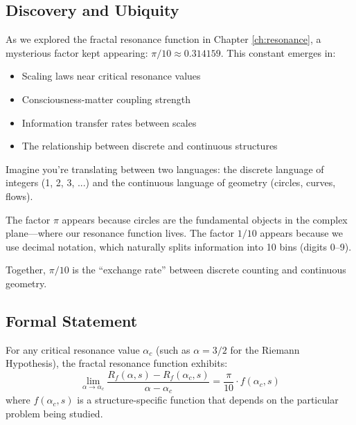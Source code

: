 \subsection{Discovery and Ubiquity}

As we explored the fractal resonance function in Chapter \ref{ch:resonance}, a mysterious factor kept appearing: $\pi/10 \approx 0.314159$. This constant emerges in:

\begin{itemize}
\item Scaling laws near critical resonance values
\item Consciousness-matter coupling strength
\item Information transfer rates between scales
\item The relationship between discrete and continuous structures
\end{itemize}

\begin{intuitive}[Why $\pi/10$?]
Imagine you're translating between two languages: the discrete language of integers (1, 2, 3, ...) and the continuous language of geometry (circles, curves, flows). 

The factor $\pi$ appears because circles are the fundamental objects in the complex plane---where our resonance function lives. The factor $1/10$ appears because we use decimal notation, which naturally splits information into 10 bins (digits 0--9).

Together, $\pi/10$ is the ``exchange rate'' between discrete counting and continuous geometry.
\end{intuitive}

\subsection{Formal Statement}

\begin{thm}\label{thm:pi-ten-scaling}
For any critical resonance value $\alpha_c$ (such as $\alpha = 3/2$ for the Riemann Hypothesis), the fractal resonance function exhibits:
\begin{equation}
\lim_{\alpha \to \alpha_c} \frac{R_f(\alpha, s) - R_f(\alpha_c, s)}{\alpha - \alpha_c} = \frac{\pi}{10} \cdot f(\alpha_c, s)
\end{equation}
where $f(\alpha_c, s)$ is a structure-specific function that depends on the particular problem being studied.
\end{thm}

